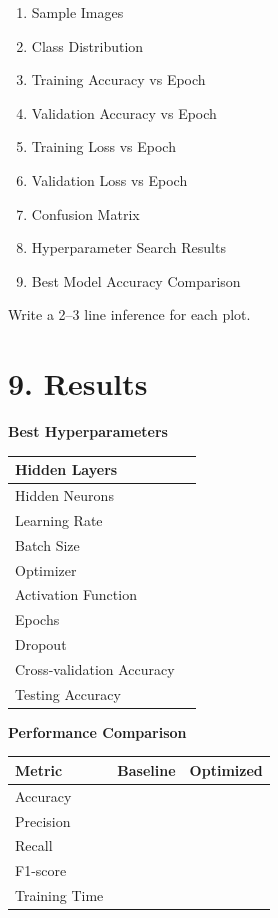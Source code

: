 \documentclass[11pt]{article}
\begin{document}
\begin{enumerate}
\item Sample Images
\item Class Distribution
\item Training Accuracy vs Epoch
\item Validation Accuracy vs Epoch
\item Training Loss vs Epoch
\item Validation Loss vs Epoch
\item Confusion Matrix
\item Hyperparameter Search Results
\item Best Model Accuracy Comparison
\end{enumerate}

Write a 2--3 line inference for each plot.

\section*{9. Results}

\textbf{Best Hyperparameters}

\begin{tabular}{|p{6cm}|p{6cm}|}
\hline
Hidden Layers &\\\hline
Hidden Neurons &\\\hline
Learning Rate &\\\hline
Batch Size &\\\hline
Optimizer &\\\hline
Activation Function &\\\hline
Epochs &\\\hline
Dropout &\\\hline
Cross-validation Accuracy &\\\hline
Testing Accuracy &\\\hline
\end{tabular}

\vspace{3mm}

\textbf{Performance Comparison}

\begin{tabular}{|p{4cm}|c|c|}
\hline
Metric & Baseline & Optimized\\
\hline
Accuracy&&\\
Precision&&\\
Recall&&\\
F1-score&&\\
Training Time&&\\
\hline
\end{tabular}
\end{document}

